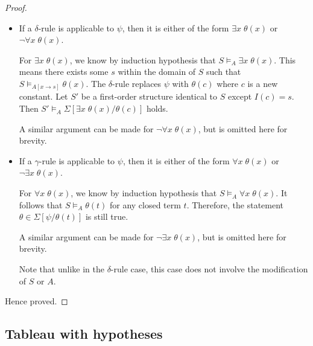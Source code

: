 \begin{proof}
\begin{itemize}
\begin{itemize}
            \item If a \(\delta\)-rule is applicable to \(\psi\), then it is either of the form \(\exists x\; \theta(x)\) or \(\neg\forall x\; \theta(x)\).
            
            For \(\exists x\; \theta(x)\), we know by induction hypothesis that \(S \models_A \exists x\; \theta(x)\). This means there exists some \(s\) within the domain of \(S\) such that \(S \models_{A[x \rightarrow s]} \theta(x)\). The \(\delta\)-rule replaces \(\psi\) with \(\theta(c)\) where \(c\) is a new constant. Let \(S'\) be a first-order structure identical to \(S\) except \(I(c) = s\). Then \(S' \models_A \Sigma[\exists x\; \theta(x) / \theta(c)]\) holds.

            A similar argument can be made for \(\neg\forall x\; \theta(x)\), but is omitted here for brevity.

            \item If a \(\gamma\)-rule is applicable to \(\psi\), then it is either of the form \(\forall x\; \theta(x)\) or \(\neg\exists x\; \theta(x)\).
            
            For \(\forall x\; \theta(x)\), we know by induction hypothesis that \(S \models_A \forall x\; \theta(x)\). It follows that \(S \models_A \theta(t)\) for any closed term \(t\). Therefore, the statement \(\theta \in \Sigma[\psi/\theta(t)]\) is still true.

            A similar argument can be made for \(\neg\exists x\; \theta(x)\), but is omitted here for brevity.

            Note that unlike in the \(\delta\)-rule case, this case does not involve the modification of \(S\) or \(A\).
        \end{itemize}
    \end{itemize}
    Hence proved.
\end{proof}




\subsection{Tableau with hypotheses}

